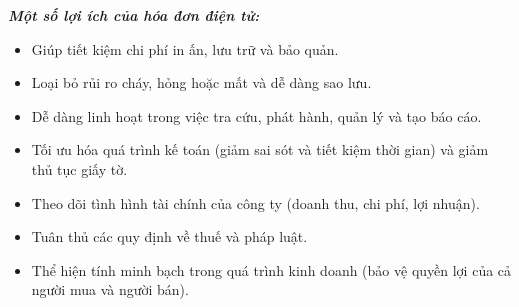 \textbf{\textit{Một số lợi ích của hóa đơn điện tử:}}


\begin{itemize}

    \item       Giúp tiết kiệm chi phí in ấn, lưu trữ và bảo quản.
    \item       Loại bỏ rủi ro cháy, hỏng hoặc mất và dễ dàng sao lưu.
    \item       Dễ dàng linh hoạt trong việc tra cứu, phát hành, quản lý và tạo báo cáo.
    \item       Tối ưu hóa quá trình kế toán (giảm sai sót và tiết kiệm thời gian) và giảm thủ tục giấy tờ.
    \item       Theo dõi tình hình tài chính của công ty (doanh thu, chi phí, lợi nhuận).
    \item       Tuân thủ các quy định về thuế và pháp luật.
    \item       Thể hiện tính minh bạch trong quá trình kinh doanh (bảo vệ quyền lợi của cả người mua và người bán).
\end{itemize}



 



